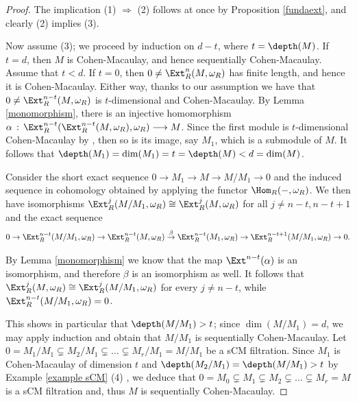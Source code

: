\documentclass[12pt]{amsart}
\theoremstyle{definition}
\theoremstyle{definition}
\let\lra\longrightarrow
\begin{document}
\begin{proof} The implication (1) $\Rightarrow$ (2) follows at once by Proposition \ref{fundaext}, and clearly (2) implies (3). 

Now assume (3); we proceed by induction on $d-t$, where  $t=\depth(M)$. If $t=d$, then $M$ is Cohen-Macaulay, and hence sequentially Cohen-Macaulay. Assume that $t<d$. If $t=0$, then $0 \ne \Ext^n_R(M,\omega_R)$ has finite length, and hence it is Cohen-Macaulay. Either way, thanks to our assumption we have that $0 \ne \Ext^{n-t}_R(M,\omega_R)$ is $t$-dimensional and Cohen-Macaulay. By Lemma \ref{monomorphism}, there is an injective homomorphism $\alpha \,:\, \Ext_R^{n-t}(\Ext_R^{n-t}(M,\omega_R),\omega_R)\lra M$. Since the first module is $t$-dimensional Cohen-Macaulay by \cite[Theorem 3.3.10 (c)]{BH93}, then so is its image, say $M_1$, which is a submodule of $M$. It follows that $\depth (M_1)=\dim (M_1) =t=\depth(M)<d=\dim(M)$.

  Consider the short exact sequence $0\lra M_1\lra M\lra M/M_1\lra 0$ and  the induced sequence in cohomology obtained by applying the functor $\Hom_R(-,\omega_R)$. We then have isomorphisms $\Ext_R^j(M/M_1,\omega_R)\cong \Ext_R^j(M,\omega_R)$ for all $j\neq n-t,n-t+1$ and the exact sequence
\begin{equation*}
    0\to \Ext_R^{n-t}(M/M_1,\omega_R)\to \Ext_R^{n-t}(M,\omega_R)%
  \stackrel{\beta}{\to } \Ext_R^{n-t}(M_1,\omega_R)\to  \Ext_R^{n-t+1} (M/M_1,\omega_R)
   \to  0.
%
\end{equation*}

\noindent
By Lemma \ref{monomorphism} we know that the map $\Ext^{n-t}(\alpha)$ is an isomorphism, and therefore $\beta$ is an isomorphism as well. It follows that $\Ext^j_R(M,\omega_R) \cong \Ext^j_R(M/M_1,\omega_R)$ for every $j \ne n-t$, while $\Ext^{n-t}_R(M/M_1,\omega_R)=0$.

\noindent
This shows in particular that $\depth(M/M_1) >t$; since $\dim(M/M_1) =d$,  we may apply induction and obtain that $M/M_1$ is sequentially Cohen-Macaulay. Let $0 = M_1/M_1 \subsetneq M_2/M_1 \subsetneq \ldots \subsetneq M_r/M_1 =M/M_1$ be a sCM filtration. Since $M_1$ is Cohen-Macaulay of dimension $t$ and $\depth(M_2/M_1) = \depth(M/M_1)>t$ by Example \ref{example sCM} (4) , we deduce that $0 = M_0 \subsetneq M_1 \subsetneq M_2 \subsetneq \ldots \subsetneq M_r=M$ is a sCM filtration and, thus $M$ is sequentially Cohen-Macaulay. 
\end{proof}
\end{document}
